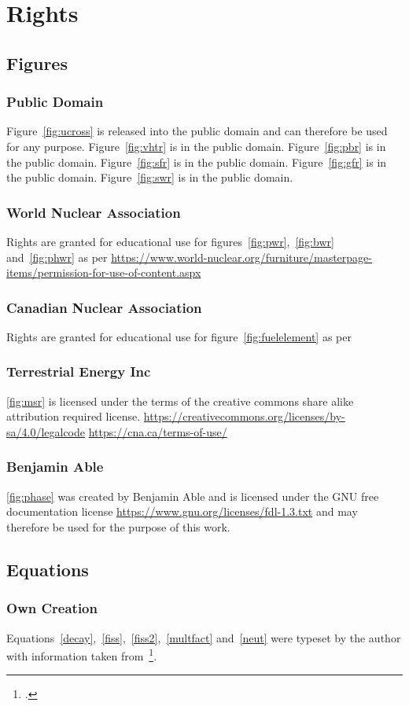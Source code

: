 \chapter{Rights}
\section{Figures}
\subsection{Public Domain}
Figure~\ref{fig:ucross} is released into the public domain and can therefore be used for any purpose.
Figure~\ref{fig:vhtr} is in the public domain.
Figure~\ref{fig:pbr} is in the public domain.
Figure~\ref{fig:sfr} is in the public domain.
Figure~\ref{fig:gfr} is in the public domain.
Figure~\ref{fig:swr} is in the public domain.
\subsection{World Nuclear Association}
Rights are granted for educational use for figures~\ref{fig:pwr},~\ref{fig:bwr} and~\ref{fig:phwr}
as per \url{https://www.world-nuclear.org/furniture/masterpage-items/permission-for-use-of-content.aspx}
\subsection{Canadian Nuclear Association}
Rights are granted for educational use for figure~\ref{fig:fuelelement} as per
\subsection{Terrestrial Energy Inc}
\ref{fig:msr} is licensed under the terms of the creative commons share alike attribution required
license. \url{https://creativecommons.org/licenses/by-sa/4.0/legalcode}
\url{https://cna.ca/terms-of-use/}
\subsection{Benjamin Able}
\ref{fig:phase} was created by Benjamin Able and is licensed under the GNU free documentation license
\url{https://www.gnu.org/licenses/fdl-1.3.txt} and may therefore be used for the purpose of this
work.
\section{Equations}
\subsection{Own Creation}
Equations~\ref{decay},~\ref{fiss},~\ref{fiss2},~\ref{multfact} and~\ref{neut} were typeset by the author with
information taken from~\footcite{ReactorDesign}.

